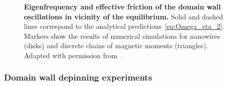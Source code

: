\begin{figure}
	\caption{\textbf{Eigenfrequency and effective friction of the domain wall oscillations in vicinity of the equilibrium.} Solid and dashed lines correspond to the analytical predictions~\eqref{eq:Omega_eta_2}. Markers show the results of numerical simulations for nanowires (disks) and discrete chains of magnetic moments (triangles). 
	Adapted with permission from~\cite{Yershov15b}.}
	\label{fig:DW_dynamics_parabola}
\end{figure}


\subsubsection{Domain wall depinning experiments} \label{subsubsec:Parabola_experiments}

